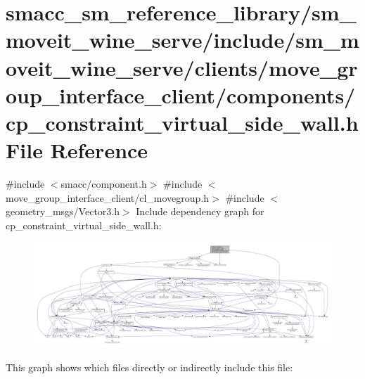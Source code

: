 \hypertarget{sm__moveit__wine__serve_2include_2sm__moveit__wine__serve_2clients_2move__group__interface__cliefeb1153c465141f08019b3a2f95ff85a}{}\section{smacc\+\_\+sm\+\_\+reference\+\_\+library/sm\+\_\+moveit\+\_\+wine\+\_\+serve/include/sm\+\_\+moveit\+\_\+wine\+\_\+serve/clients/move\+\_\+group\+\_\+interface\+\_\+client/components/cp\+\_\+constraint\+\_\+virtual\+\_\+side\+\_\+wall.h File Reference}
\label{sm__moveit__wine__serve_2include_2sm__moveit__wine__serve_2clients_2move__group__interface__cliefeb1153c465141f08019b3a2f95ff85a}
{\ttfamily \#include $<$smacc/component.\+h$>$}\newline
{\ttfamily \#include $<$move\+\_\+group\+\_\+interface\+\_\+client/cl\+\_\+movegroup.\+h$>$}\newline
{\ttfamily \#include $<$geometry\+\_\+msgs/\+Vector3.\+h$>$}\newline
Include dependency graph for cp\+\_\+constraint\+\_\+virtual\+\_\+side\+\_\+wall.\+h\+:
\nopagebreak
\begin{figure}[H]
\begin{center}
\leavevmode
\includegraphics[width=350pt]{sm__moveit__wine__serve_2include_2sm__moveit__wine__serve_2clients_2move__group__interface__cliec7421f096520b74d30090e778d71094d}
\end{center}
\end{figure}
This graph shows which files directly or indirectly include this file\+:
\nopagebreak
